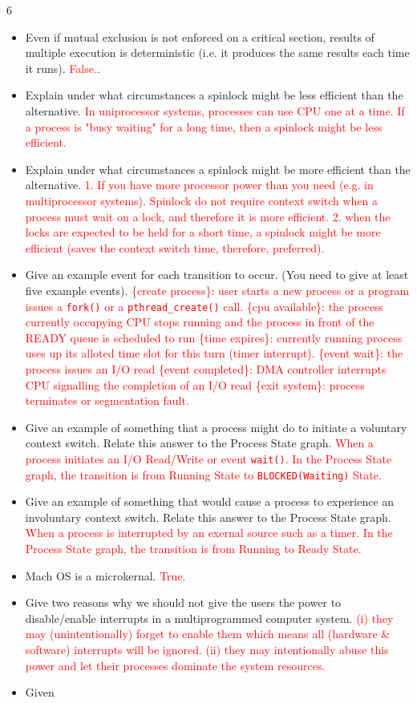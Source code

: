 \documentclass[9pt,landscape]{memoir}
\newcommand{\answer}[1]{\textcolor{red}{#1}}
\begin{document}
\begin{multicols}{6}
\begin{itemize}
    \item Even if mutual exclusion is not enforced on a critical section, results of multiple execution is deterministic (i.e. it produces the same results each time it runs). \answer{False.}.
    \item Explain under what circumstances a spinlock might be less efficient than the alternative.  \answer{In uniprocessor systems, processes can use CPU one at a time.  If a process is "busy waiting" for a long time, then a spinlock might be less efficient.}
    \item Explain under what circumstances a spinlock might be more efficient than the alternative.  \answer{1. If you have more processor power than you need (e.g. in multiprocessor systems). Spinlock do not require context switch when a process must wait on a lock, and therefore it is more efficient.  2. when the locks are expected to be held for a short time, a spinlock might be more efficient (saves the context switch time, therefore, preferred).}
    \item Give an example event for each transition to occur. (You need to give at least five example events). \answer{\{create process\}: user starts a new process or a program issues a \texttt{fork()} or a \texttt{pthread\_create()} call. \{cpu available\}: the process currently occupying CPU stops running and the process in front of the READY queue is scheduled to run \{time expires\}: currently running process uses up its alloted time slot for this turn (timer interrupt). \{event wait\}: the process issues an I/O read \{event completed\}: DMA controller interrupts CPU signalling the completion of an I/O read \{exit system\}: process terminates or segmentation fault.}
    \item Give an example of something that a process might do to initiate a voluntary context switch.  Relate this answer to the Process State graph. \answer{When a process initiates an I/O Read/Write or event \texttt{wait()}. In the Process State graph, the transition is from Running State to \texttt{BLOCKED(Waiting)} State.}
    \item Give an example of something that would cause a process to experience an involuntary context switch.  Relate this answer to the Process State graph.  \answer{When a process is interrupted by an exernal source such as a timer.  In the Process State graph, the transition is from Running to Ready State.}
    \item Mach OS is a microkernal. \answer{True.}
    \item Give two reasons why we should not give the users the power to disable/enable interrupts in a multiprogrammed computer system.  \answer{(i) they may (unintentionally) forget to enable them which means all (hardware \& software) interrupts will be ignored.  (ii) they may intentionally abuse this power and let their processes dominate the system resources.}
    \item Given
\end{itemize}


\end{multicols}
\end{document}
